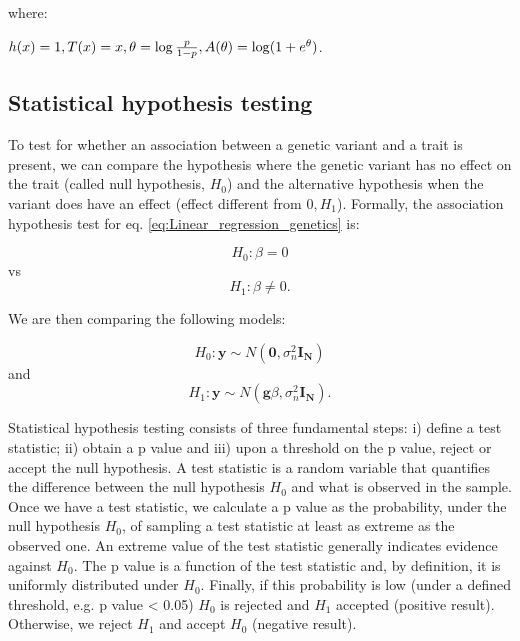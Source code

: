 \begin{Comment}
where: 

\hfill $h(x)=1, \hfill T(x)=x, \hfill \theta = \log \frac{p}{1-p}, \hfill A(\theta) = \log (1+e^\theta)$. \hfill

\end{Comment}


\newpage

\subsection{Statistical hypothesis testing}
\label{sec:hypothesis_testing}

To test for whether an association between a genetic variant and a trait is present, we can compare the hypothesis where the genetic variant has no effect on the trait (called null hypothesis, $H_0$) and the alternative hypothesis when the variant does have an effect (effect different from $0, H_1$).
Formally, the association hypothesis test for eq. \eqref{eq:Linear_regression_genetics} is:

\begin{equation}\label{eq:null_hypothesis}
 H_{0}: \beta=0 
\end{equation}
vs
\begin{equation}\label{eq:alternative_hypothesis}
 H_{1}: \beta \neq 0. 
\end{equation}

\vspace{4mm}

We are then comparing the following models:

\begin{equation}\label{eq:null_hypothesis_regression}
 H_0: \mathbf{y} \sim N(\mathbf{0}, \sigma_n^{2} \mathbf{I_N}) 
\end{equation}
and
\begin{equation}\label{eq:alternative_hypothesis_regression}
 H_1: \mathbf{y} \sim N(\mathbf{g}\beta,\sigma_n^{2} \mathbf{I_N}). 
\end{equation}

\vspace{4mm}

Statistical hypothesis testing consists of three fundamental steps: i) define a test statistic; ii) obtain a p value and iii) upon a threshold on the p value, reject or accept the null hypothesis. 
A test statistic is a random variable that quantifies the difference between the null hypothesis $H_0$ and what is observed in the sample. 
Once we have a test statistic, we calculate a p value as the probability, under the null hypothesis $H_0$, of sampling a test statistic at least as extreme as the observed one. 
An extreme value of the test statistic generally indicates evidence against $H_0$.
The p value is a function of the test statistic and, by definition, it is uniformly distributed under $H_0$.
Finally, if this probability is low (under a defined threshold, e.g. p value < 0.05) $H_0$ is rejected and $H_1$ accepted (positive result).
Otherwise, we reject $H_1$ and accept $H_0$ (negative result).\\


